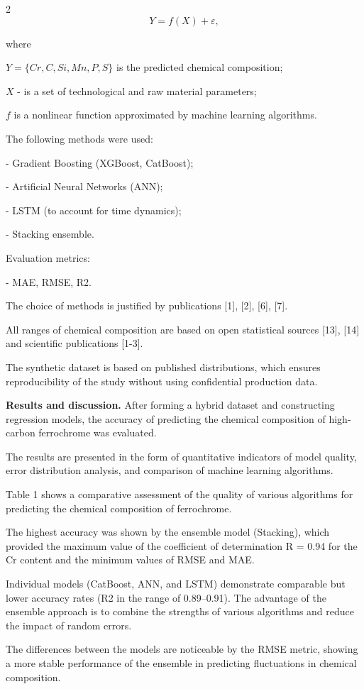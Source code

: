 \begin{multicols}{2}
\begin{equation}
Y=f(X)+\varepsilon,
\end{equation}

where

\(Y = \{Cr, C, Si, Mn, P, S\}\) is the predicted chemical
composition;

\(X\) - is a set of technological and raw material parameters;

\(f\) is a nonlinear function approximated by machine learning algorithms.

The following methods were used:

- Gradient Boosting (XGBoost, CatBoost);

- Artificial Neural Networks (ANN);

- LSTM (to account for time dynamics);

- Stacking ensemble.

Evaluation metrics:

- MAE, RMSE, R2.

The choice of methods is justified by publications {[}1{]}, {[}2{]},
{[}6{]}, {[}7{]}.

All ranges of chemical composition are based on open statistical sources
{[}13{]}, {[}14{]} and scientific publications {[}1-3{]}.

The synthetic dataset is based on published distributions, which ensures
reproducibility of the study without using confidential production data.

{\bfseries Results and discussion.} After forming a hybrid dataset and
constructing regression models, the accuracy of predicting the chemical
composition of high-carbon ferrochrome was evaluated.

The results are presented in the form of quantitative indicators of
model quality, error distribution analysis, and comparison of machine
learning algorithms.

Table 1 shows a comparative assessment of the quality of various
algorithms for predicting the chemical composition of ferrochrome.

The highest accuracy was shown by the ensemble model (Stacking), which
provided the maximum value of the coefficient of determination
R = 0.94 for the Cr content and the minimum values of
RMSE and MAE.

Individual models (CatBoost, ANN, and LSTM) demonstrate comparable but
lower accuracy rates (R2 in the range of 0.89--0.91). The advantage of
the ensemble approach is to combine the strengths of various algorithms
and reduce the impact of random errors.

The differences between the models are noticeable by the RMSE metric,
showing a more stable performance of the ensemble in predicting
fluctuations in chemical composition.
\end{multicols}

